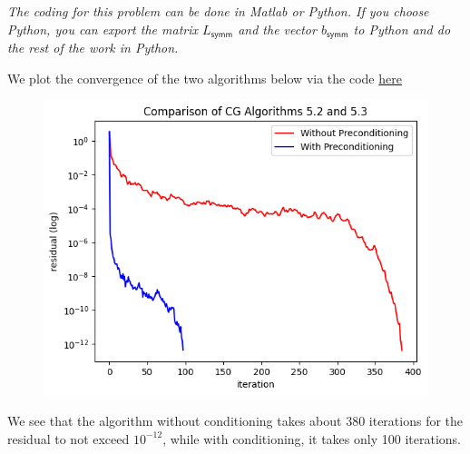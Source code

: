 \documentclass{../../../kin_math}
\begin{document}
\begin{questions}
  \emph{The coding for this problem can be done in Matlab or Python. If you choose Python, you can export the matrix $L_\textsf{symm}$ and the vector $b_\textsf{symm}$ to Python and do the rest of the work in Python.}
  \begin{solution}
    We plot the convergence of the two algorithms below via the code \href{https://github.com/elijahkin/school/blob/main/umd/amsc660/hw8/hw8.ipynb}{here}
    \begin{figure}
      \centering
      \includegraphics[scale=0.7]{cg.png}
    \end{figure}
    We see that the algorithm without conditioning takes about 380 iterations for the residual to not exceed $10^{-12}$, while with conditioning, it takes only 100 iterations.
  \end{solution}
\end{questions}
\end{document}
